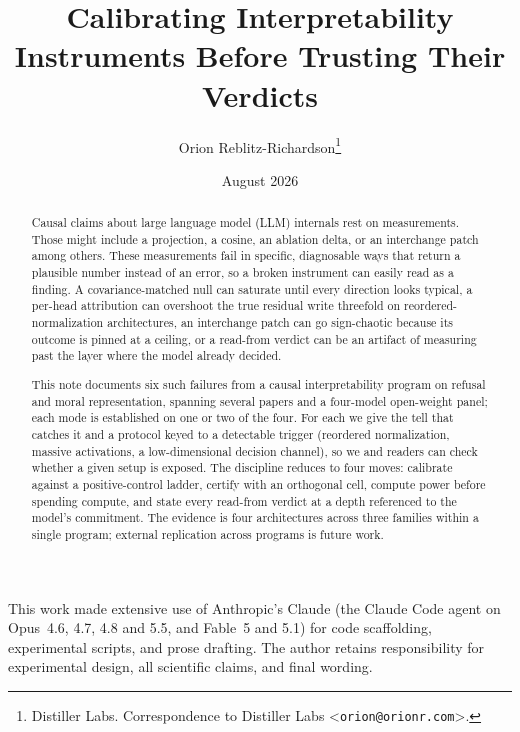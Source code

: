 \documentclass{article}
\title{Calibrating Interpretability Instruments Before Trusting Their Verdicts}
\author{%
  Orion Reblitz-Richardson\thanks{%
    Distiller Labs. Correspondence to Distiller Labs
    \textless\texttt{orion@orionr.com}\textgreater.}
}
\date{August 2026}
\begin{document}
\maketitle

\begin{abstract}
Causal claims about large language model (LLM) internals rest on measurements. Those might
include a projection, a cosine, an ablation delta, or an interchange patch among others. These
measurements fail in specific, diagnosable ways that return a plausible number instead of an
error, so a broken instrument can easily read as a finding. A covariance-matched null can
saturate until every direction looks typical, a per-head attribution can overshoot the true
residual write threefold on reordered-normalization architectures, an interchange patch can go
sign-chaotic because its outcome is pinned at a ceiling, or a read-from verdict can be an
artifact of measuring past the layer where the model already decided.

This note documents six such failures from a causal interpretability program on refusal and
moral representation, spanning several papers and a four-model open-weight panel; each mode is
established on one or two of the four. For each we give the tell that catches it and a protocol
keyed to a detectable trigger (reordered normalization, massive activations, a low-dimensional
decision channel), so we and readers can check whether a given setup is exposed. The discipline
reduces to four moves: calibrate against a positive-control ladder, certify with an orthogonal
cell, compute power before spending compute, and state every read-from verdict at a depth
referenced to the model's commitment. The evidence is four architectures across three families
within a single program; external replication across programs is future work.
\end{abstract}











\begin{ack}
This work made extensive use of Anthropic's Claude (the Claude Code agent on
Opus~4.6, 4.7, 4.8 and 5.5, and Fable~5 and 5.1) for code scaffolding, experimental scripts, and
prose drafting. The author retains responsibility for experimental design, all
scientific claims, and final wording.
\end{ack}


\end{document}
